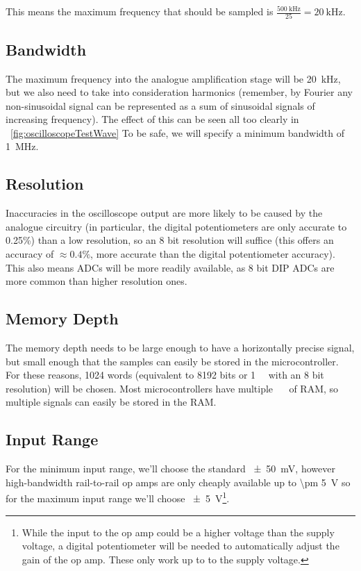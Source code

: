 This means the maximum frequency that should be sampled is
$\frac{\SI{500}{\kHz}}{25} = \SI{20}{\kHz}$.

\subsection*{Bandwidth}

The maximum frequency into the analogue amplification stage will be
\SI{20}{\kHz}, but we also need to take into consideration harmonics (remember,
by Fourier any non-sinusoidal signal can be represented as a sum of sinusoidal
signals of increasing frequency). The effect of this can be seen all too clearly
in ~\cref{fig:oscilloscopeTestWave} To be safe, we will specify a minimum
bandwidth of \SI{1}{\MHz}.

\subsection*{Resolution}

Inaccuracies in the oscilloscope output are more likely to be caused by the
analogue circuitry (in particular, the digital potentiometers are only accurate
to 0.25\%) than a low resolution, so an 8 bit resolution will suffice (this
offers an accuracy of $\approx 0.4\%$, more accurate than the digital
potentiometer accuracy). This also means ADCs will be more readily available, as
8 bit DIP ADCs are more common than higher resolution ones.

\subsection*{Memory Depth}

The memory depth needs to be large enough to have a horizontally precise signal,
but small enough that the samples can easily be stored in the microcontroller.
For these reasons, 1024 words (equivalent to 8192 bits or \SI{1}{\kilo\byte}
with an 8 bit resolution) will be chosen. Most microcontrollers have multiple
\SI{}{\kilo\byte} of RAM, so multiple signals can easily be stored in the
RAM.

\subsection*{Input Range}

For the minimum input range, we'll choose the standard \SI{\pm 50}{\mV}, however
high-bandwidth rail-to-rail op amps are only cheaply available up to \SI{\pm
5}{\V} so for the maximum input range we'll choose \SI{\pm 5}{\V}\footnote{While
  the input to the op amp could be a higher voltage than the supply voltage, a
digital potentiometer will be needed to automatically adjust the gain of the op
amp. These only work up to to the supply voltage.}.

